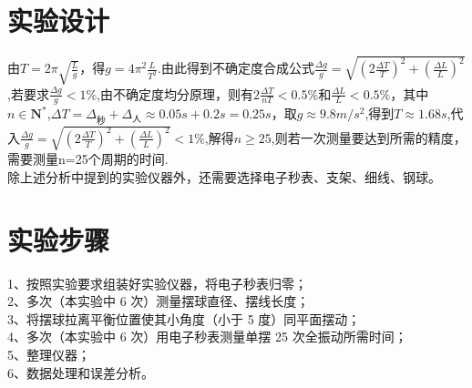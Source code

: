 \documentclass[12pt,a4paper]{article}
\begin{document}
	\section{实验设计}
	由$T=2\pi\sqrt{\frac{L}{g}}$，得$g=4\pi^2\frac{L}{T^2}$.由此得到不确定度合成公式$\frac{\Delta g}{g}=\sqrt{{(2\frac{\Delta T}{T})}^2+{(\frac{\Delta L}{L})}^2}$,若要求$\frac{\Delta g}{g}<1\%$,由不确定度均分原理，则有$2\frac{\Delta T}{nT}<0.5\%$和$\frac{\Delta L}{L}<0.5\%$，其中$n\in \mathbf{N}^*$,$\Delta T=\Delta_{\text{秒}}+\Delta_{\text{人}}\approx0.05s+0.2s=0.25s$，取$g\approx9.8m/s^2$,得到$T\approx1.68s$,代入$\frac{\Delta g}{g}=\sqrt{{(2\frac{\Delta T}{T})}^2+{(\frac{\Delta L}{L})}^2}<1\%$,解得$n\geq25$,则若一次测量要达到所需的精度，需要测量n=25个周期的时间. \\
	\hspace*{2em}
	除上述分析中提到的实验仪器外，还需要选择电子秒表、支架、细线、钢球。
	
	\section{实验步骤}
	1、按照实验要求组装好实验仪器，将电子秒表归零；\\
	\hspace*{2em}
	2、多次（本实验中 6 次）测量摆球直径、摆线长度；\\
	\hspace*{2em}
	3、将摆球拉离平衡位置使其小角度（小于 5 度）同平面摆动；\\
	\hspace*{2em}
	4、多次（本实验中 6 次）用电子秒表测量单摆 25 次全振动所需时间；\\
	\hspace*{2em}
	5、整理仪器；\\
	\hspace*{2em}
	6、数据处理和误差分析。\\
	
\end{document}
